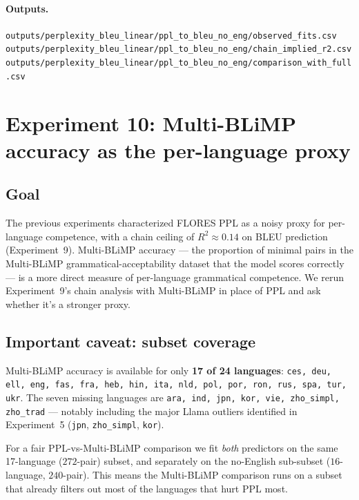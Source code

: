 \documentclass[11pt]{article}
\newcommand{\code}[1]{\texttt{\small #1}}
\begin{document}
\paragraph{Outputs.}

\code{outputs/perplexity\_bleu\_linear/ppl\_to\_bleu\_no\_eng/observed\_fits.csv} \\
\code{outputs/perplexity\_bleu\_linear/ppl\_to\_bleu\_no\_eng/chain\_implied\_r2.csv} \\
\code{outputs/perplexity\_bleu\_linear/ppl\_to\_bleu\_no\_eng/comparison\_with\_full.csv}

\section{Experiment 10: Multi-BLiMP accuracy as the per-language proxy}
\label{sec:multiblimp}

\subsection{Goal}

The previous experiments characterized FLORES PPL as a noisy proxy for
per-language competence, with a chain ceiling of $R^2 \approx 0.14$ on
BLEU prediction (Experiment~9). Multi-BLiMP accuracy --- the proportion
of minimal pairs in the Multi-BLiMP grammatical-acceptability dataset
that the model scores correctly --- is a more direct measure of
per-language grammatical competence. We rerun Experiment~9's chain
analysis with Multi-BLiMP in place of PPL and ask whether it's a
stronger proxy.

\subsection{Important caveat: subset coverage}

Multi-BLiMP accuracy is available for only \textbf{17 of 24
languages}: \code{ces, deu, ell, eng, fas, fra, heb, hin, ita, nld,
pol, por, ron, rus, spa, tur, ukr}. The seven missing languages are
\code{ara, ind, jpn, kor, vie, zho\_simpl, zho\_trad} --- notably
including the major Llama outliers identified in Experiment~5
(\code{jpn}, \code{zho\_simpl}, \code{kor}).

For a fair PPL-vs-Multi-BLiMP comparison we fit \emph{both} predictors
on the same 17-language ($272$-pair) subset, and separately on the
no-English sub-subset ($16$-language, $240$-pair). This means the
Multi-BLiMP comparison runs on a subset that already filters out most
of the languages that hurt PPL most.
\end{document}
